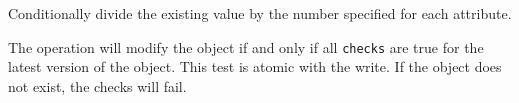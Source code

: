 Conditionally divide the existing value by the number specified for each attribute.

The operation will modify the object if and only if all \texttt{checks} are true
for the latest version of the object.  This test is atomic with the write.  If
the object does not exist, the checks will fail.




